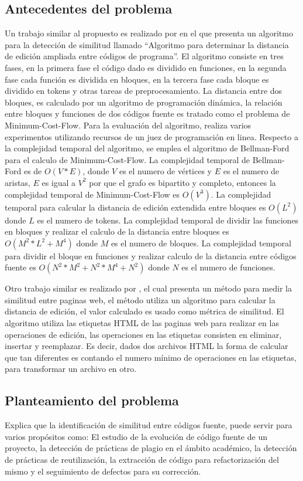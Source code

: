 \subsection{Antecedentes del problema}
Un trabajo similar al propuesto es realizado por \cite{Anzai2019} en el que presenta un algoritmo para la detección de similitud llamado ``Algoritmo para determinar la distancia de edición ampliada entre códigos de programa''. El algoritmo consiste en tres fases, en la primera fase el código dado es dividido en funciones, en la segunda fase cada función es dividida en bloques, en la tercera fase cada bloque es dividido en tokens y otras tareas de preprocesamiento. La distancia entre dos bloques, es calculado por un algoritmo de programación dinámica, la relación entre bloques y funciones de dos códigos fuente es tratado como el problema de Minimum-Cost-Flow. Para la evaluación del algoritmo, realiza varios experimentos utilizando recursos de un juez de programación en linea. Respecto a la complejidad temporal del algoritmo, se emplea el algoritmo de Bellman-Ford para el calculo de Minimum-Cost-Flow. La complejidad temporal de Bellman-Ford es de $O(V*E)$, donde $V$ es el numero de vértices y $E$ es el numero de aristas, $E$ es igual a $V^{2}$ por que el grafo es bipartito y completo, entonces la complejidad temporal de Minimum-Cost-Flow es $O(V^{3})$. La complejidad temporal para calcular la distancia de edición extendida entre bloques es $O(L^{2})$ donde $L$ es el numero de tokens. La complejidad temporal de dividir las funciones en bloques y realizar el calculo de la distancia entre bloques es $O(M^{2}*L^{2}+M^{4})$ donde $M$ es el numero de bloques. La complejidad temporal para dividir el bloque en funciones y realizar calculo de la distancia entre códigos fuente es $O(N^{2}*M^{2}+N^{2}*M^{4}+N^{2})$ donde $N$ es el numero de funciones.

Otro trabajo similar es realizado por \cite{Popescu2016}, el cual presenta un método para medir la similitud entre paginas web, el método utiliza un algoritmo para calcular la distancia de edición, el valor calculado es usado como métrica de similitud. El algoritmo utiliza las etiquetas HTML de las paginas web para realizar en las operaciones de edición, las operaciones en las etiquetas consisten en eliminar, insertar y reemplazar. Es decir, dados dos archivos HTML la forma de calcular que tan diferentes es contando el numero mínimo de operaciones en las etiquetas, para transformar un archivo en otro.

\subsection{Planteamiento del problema}
\cite{Cheers2021} Explica que la identificación de similitud entre códigos fuente, puede servir para varios propósitos como: El estudio de la evolución de código fuente de un proyecto, la detección de prácticas de plagio en el ámbito académico, la detección de prácticas de reutilización, la extracción de código para refactorización del mismo y el seguimiento de defectos para su corrección.

